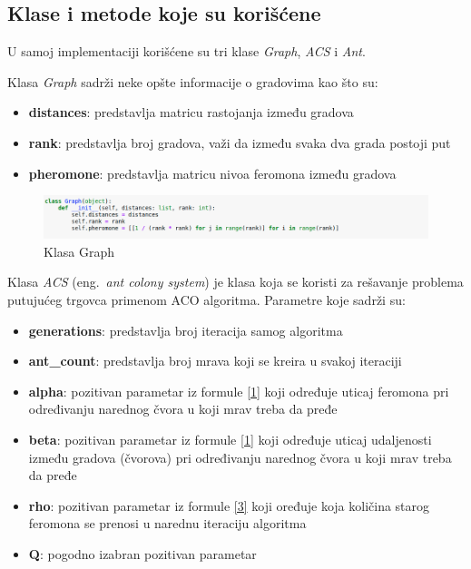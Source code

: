 \documentclass[a4paper]{article}
\begin{document}
\subsection{Klase i metode koje su korišćene}
U samoj implementaciji korišćene su tri klase \textit{Graph}, \textit{ACS} i \textit{Ant}. 

Klasa \textit{Graph} sadrži neke opšte informacije o gradovima kao što su:
\begin{itemize}
  \item \textbf{distances}: predstavlja matricu rastojanja između gradova
  \item \textbf{rank}: predstavlja broj gradova, važi da između svaka dva grada postoji put
  \item \textbf{pheromone}: predstavlja matricu nivoa feromona između gradova 
\end{itemize}

\begin{figure}[h!]
\begin{center}
\includegraphics[width=1\columnwidth]{slika1.png}
\end{center}
\caption{Klasa Graph}
\label{fig:slika1}
\end{figure}

Klasa \textit{ACS} (eng.~{\em ant colony system}) je klasa koja se koristi za rešavanje problema putujućeg trgovca primenom ACO algoritma. Parametre koje sadrži su:

\begin{itemize}
	\item \textbf{generations}: predstavlja broj iteracija samog algoritma
	\item \textbf{ant\_count}: predstavlja broj mrava koji se kreira u svakoj iteraciji
	\item \textbf{alpha}: pozitivan parametar iz formule \ref{1} koji određuje uticaj feromona pri određivanju narednog čvora u koji mrav treba da pređe
	\item \textbf{beta}: pozitivan parametar iz formule \ref{1} koji određuje uticaj udaljenosti između gradova (čvorova) pri određivanju narednog čvora u koji mrav treba da pređe
	\item \textbf{rho}: pozitivan parametar iz formule \ref{3} koji oređuje koja količina starog feromona se prenosi u narednu iteraciju algoritma
	\item \textbf{Q}: pogodno izabran pozitivan parametar
		
\end{itemize}
\end{document}
